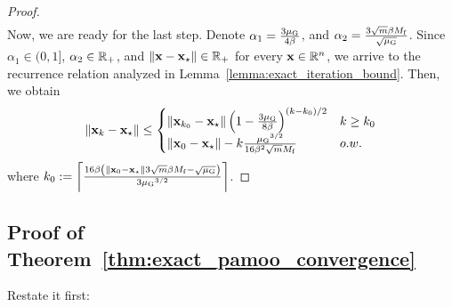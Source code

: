 \begin{proof}
\begin{align*}
\end{align*}
Now, we are ready for the last step. Denote $\alpha_1 = \frac{3{\mu_{\mathrm{G}}}}{4\beta}$, and $\alpha_2 = \frac{3\sqrt{m}\beta M_{\mathrm{f}}}{\sqrt{{\mu_{\mathrm{G}}}}}$. Since $\alpha_1 \in (0,1]$, $\alpha_2 \in \mathbb{R}_+$, and $\left\Vert{\mathbf{x}}-{\mathbf{x}}_\star\right\Vert \in \mathbb{R}_+$ for every ${\mathbf{x}} \in \mathbb{R}^n$, we arrive to the recurrence relation analyzed in Lemma~\ref{lemma:exact_iteration_bound}. Then, we obtain
    \begin{align*}
        \left\Vert{\mathbf{x}}_{k} - {\mathbf{x}}_\star\right\Vert \leq 
        \begin{cases}
            \left\Vert{\mathbf{x}}_{k_0} - {\mathbf{x}}_\star\right\Vert \left(1-\frac{3{\mu_{\mathrm{G}}}}{8\beta}\right)^{(k-k_0)/2}  & k\geq k_0\\
            \left\Vert{\mathbf{x}}_0 - {\mathbf{x}}_\star\right\Vert- k \frac{{\mu_{\mathrm{G}}}^{3/2}}{16 \beta^2 \sqrt{m} M_{\mathrm{f}}} & o.w.
        \end{cases}
    \end{align*}
where $k_0 := \left\lceil \frac{16 \beta  \left(\left\Vert{\mathbf{x}}_0 - {\mathbf{x}}_\star\right\Vert 3\sqrt{m}\beta M_{\mathrm{f}} -\sqrt{{\mu_{\mathrm{G}}}}\right) }{ 3{\mu_{\mathrm{G}}}^{3/2}}\right\rceil$.
\end{proof}

\subsection{Proof of Theorem~\ref{thm:exact_pamoo_convergence}}
Restate it first:
\ExactPAmooConvergence*

